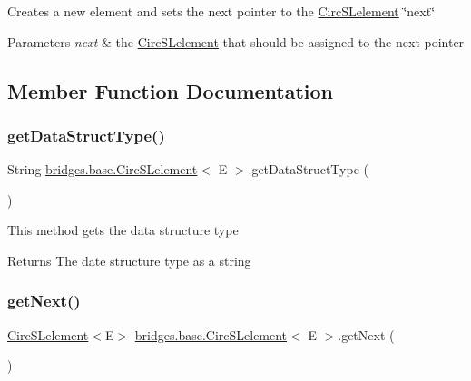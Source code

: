 Creates a new element and sets the next pointer to the \hyperlink{classbridges_1_1base_1_1_circ_s_lelement}{Circ\+S\+Lelement} \char`\"{}next\char`\"{}


\begin{DoxyParams}{Parameters}
{\em next} & the \hyperlink{classbridges_1_1base_1_1_circ_s_lelement}{Circ\+S\+Lelement} that should be assigned to the next pointer \\
\hline
\end{DoxyParams}


\subsection{Member Function Documentation}
\mbox{\label{classbridges_1_1base_1_1_circ_s_lelement_ad56acddc52e8e0b6869a6f24f1e0a90e}} 
\subsubsection{\texorpdfstring{get\+Data\+Struct\+Type()}{getDataStructType()}}
{\footnotesize\ttfamily String \hyperlink{classbridges_1_1base_1_1_circ_s_lelement}{bridges.\+base.\+Circ\+S\+Lelement}$<$ E $>$.get\+Data\+Struct\+Type (\begin{DoxyParamCaption}{ }\end{DoxyParamCaption})}

This method gets the data structure type

\begin{DoxyReturn}{Returns}
The date structure type as a string 
\end{DoxyReturn}
\mbox{\label{classbridges_1_1base_1_1_circ_s_lelement_ae18b07e3f1d37b5eca0cae22efc0d395}} 
\subsubsection{\texorpdfstring{get\+Next()}{getNext()}}
{\footnotesize\ttfamily \hyperlink{classbridges_1_1base_1_1_circ_s_lelement}{Circ\+S\+Lelement}$<$E$>$ \hyperlink{classbridges_1_1base_1_1_circ_s_lelement}{bridges.\+base.\+Circ\+S\+Lelement}$<$ E $>$.get\+Next (\begin{DoxyParamCaption}{ }\end{DoxyParamCaption})}

